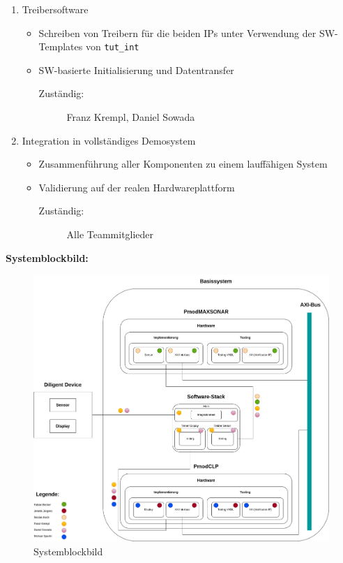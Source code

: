 \begin{enumerate}
   \item Treibersoftware
   \begin{itemize}
     \item Schreiben von Treibern für die beiden IPs unter Verwendung der SW-Templates von \texttt{tut\_int}
     \item SW-basierte Initialisierung und Datentransfer
     \begin{description}
       \item[Zuständig:] Franz Krempl, Daniel Sowada
     \end{description}
   \end{itemize}
   \item Integration in vollständiges Demosystem
   \begin{itemize}
     \item Zusammenführung aller Komponenten zu einem lauffähigen System
     \item Validierung auf der realen Hardwareplattform
     \begin{description}
       \item[Zuständig:] Alle Teammitglieder
     \end{description}
   \end{itemize}
\end{enumerate}
\textbf{Systemblockbild:}\\
\begin{figure}[h!]
  \centering
  \begin{minipage}{\textwidth}
      \includegraphics[width=\linewidth]{./images/system.drawio.png} %
  \end{minipage}
  \caption{Systemblockbild}
  \label{fig:system}
\end{figure}
